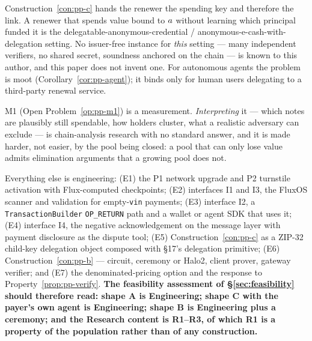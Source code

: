 \begin{openproblem}
\label{op:pp-r2}
Construction~\ref{con:pp-c} hands the renewer the spending key and therefore the link. A renewer that
spends value bound to $a$ without learning which principal funded it is the
delegatable-anonymous-credential / anonymous-e-cash-with-delegation setting. No issuer-free instance
for \emph{this} setting --- many independent verifiers, no shared secret, soundness anchored on the
chain --- is known to this author, and this paper does not invent one. For autonomous agents the
problem is moot (Corollary~\ref{cor:pp-agent}); it binds only for human users delegating to a
third-party renewal service.
\end{openproblem}

\begin{openproblem}
\label{op:pp-r3}
M1 (Open Problem~\ref{op:pp-m1}) is a measurement. \emph{Interpreting} it --- which notes are
plausibly still spendable, how holders cluster, what a realistic adversary can exclude --- is
chain-analysis research with no standard answer, and it is made harder, not easier, by the pool being
closed: a pool that can only lose value admits elimination arguments that a growing pool does not.
\end{openproblem}

Everything else is engineering: (E1) the P1 network upgrade and P2 turnstile activation with
Flux-computed checkpoints; (E2) interfaces I1 and I3, the FluxOS scanner and \PNR{} validation for
empty-\texttt{vin} payments; (E3) interface I2, a \texttt{Transaction\allowbreak{}Builder} \texttt{OP\_RETURN} path
and a wallet or agent SDK that uses it; (E4) interface I4, the negative acknowledgement on the message
layer with payment disclosure as the dispute tool; (E5) Construction~\ref{con:pp-c} as a ZIP-32
child-key delegation object composed with \S17's delegation primitive; (E6) Construction~\ref{con:pp-b}
--- circuit, ceremony or Halo2, client prover, gateway verifier; and (E7) the denominated-pricing
option and the response to Property~\ref{prop:pp-verify}. \textbf{The feasibility assessment of \S\ref{sec:feasibility}
should therefore read: shape A is Engineering; shape C with the payer's own agent is Engineering;
shape B is Engineering plus a ceremony; and the Research content is R1--R3, of which R1 is a property
of the population rather than of any construction.}

